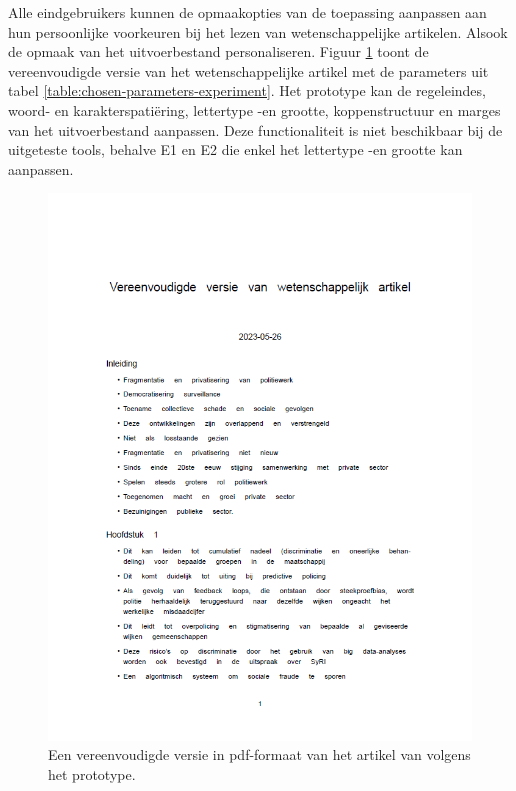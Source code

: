 \medspace

Alle eindgebruikers kunnen de opmaakopties van de toepassing aanpassen aan hun persoonlijke voorkeuren bij het lezen van wetenschappelijke artikelen. Alsook de opmaak van het uitvoerbestand personaliseren. Figuur \ref{img:screenshot-pdf-attempt} toont de vereenvoudigde versie van het wetenschappelijke artikel met de parameters uit tabel \ref{table:chosen-parameters-experiment}. Het prototype kan de regeleindes, woord- en karakterspatiëring, lettertype -en grootte, koppenstructuur en marges van het uitvoerbestand aanpassen. Deze functionaliteit is niet beschikbaar bij de uitgeteste tools, behalve E1 en E2 die enkel het lettertype -en grootte kan aanpassen. 

\begin{figure}[H]
	\includegraphics[width=\linewidth]{img/screenshot-prototype-pdf.png}
	\caption{Een vereenvoudigde versie in pdf-formaat van het artikel van \textcite{VanBrakel2022} volgens het prototype.}
	\label{img:screenshot-pdf-attempt}
\end{figure}

